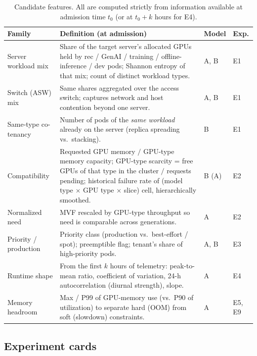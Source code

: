 \begin{table}[h]
\centering\small
\caption{Candidate features. All are computed strictly from information available at admission time $t_0$ (or at $t_0 + k$ hours for E4).}
\label{tab:features}
\begin{tabularx}{\linewidth}{@{}P{2.5cm}LP{0.9cm}P{1.1cm}@{}}
\toprule
Family & Definition (at admission) & Model & Exp. \\
\midrule
Server workload mix & Share of the target server's allocated GPUs held by rec / GenAI / training / offline-inference / dev pods; Shannon entropy of that mix; count of distinct workload types. & A, B & E1 \\
Switch (ASW) mix & Same shares aggregated over the access switch; captures network and host contention beyond one server. & A, B & E1 \\
Same-type co-tenancy & Number of pods of the \emph{same workload} already on the server (replica spreading vs.\ stacking). & B & E1 \\
Compatibility & Requested GPU memory $/$ GPU-type memory capacity; GPU-type scarcity = free GPUs of that type in the cluster $/$ requests pending; historical failure rate of (model type $\times$ GPU type $\times$ slice) cell, hierarchically smoothed. & B (A) & E2 \\
Normalized need & MVF rescaled by GPU-type throughput so need is comparable across generations. & A & E2 \\
Priority / production & Priority class (production vs.\ best-effort / spot); preemptible flag; tenant's share of high-priority pods. & A, B & E3 \\
Runtime shape & From the first $k$ hours of telemetry: peak-to-mean ratio, coefficient of variation, 24-h autocorrelation (diurnal strength), slope. & A & E4 \\
Memory headroom & Max / P99 of GPU-memory use (vs.\ P90 of utilization) to separate hard (OOM) from soft (slowdown) constraints. & A & E5, E9 \\
\bottomrule
\end{tabularx}
\end{table}

\subsection{Experiment cards}

\newcommand{\expcard}[7]{%
\begin{tcolorbox}[colback=white,colframe=black!25,boxrule=0.5pt,arc=2pt,left=5pt,right=5pt,top=3pt,bottom=3pt,title={\small\textbf{#1}\hfill\textsc{#2}},colbacktitle=soft,coltitle=black,fonttitle=\small]
\small
\textbf{Hypothesis.} #3\par\smallskip
\textbf{Design.} #4\par\smallskip
\textbf{Metric \& decision rule.} #5\par\smallskip
\textbf{Why it matters.} #6\par\smallskip
\textbf{Feasibility.} #7
\end{tcolorbox}}

